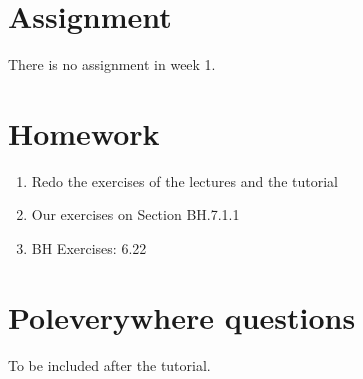 \documentclass[a4paper,11pt]{book}
\begin{document}
\section{Assignment}
\label{sec:assignment}

There is no assignment in week 1.


\section{Homework}
\label{sec:homework}

\begin{enumerate}
\item Redo the exercises of the lectures and the tutorial
\item Our exercises on Section BH.7.1.1
\item BH Exercises: 6.22
\end{enumerate}



\section{Poleverywhere questions}
\label{sec:polev-quest}

To be included after the tutorial.


\end{document}
